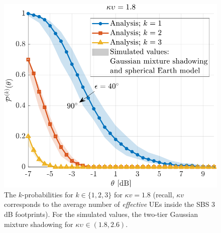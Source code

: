 \documentclass[lettersize,journal]{IEEEtran}
\begin{document}
  
\begin{figure}[h]
  \centering
  \includegraphics[width=\linewidth]{kprobabilities.pdf}
  \caption{The $k$-probabilities for $k \in \{1,2,3\}$ for $\kappa v=1.8$ (recall, $\kappa v$ corresponds to the average number of \textit{effective} UEs inside the SBS $3$ dB footprints). For the simulated values, the two-tier Gaussian mixture shadowing for $\kappa \upsilon_{} \in (1.8,2.6)$.
} 
  \label{fig:antennapats}
\end{figure}









\end{document}
